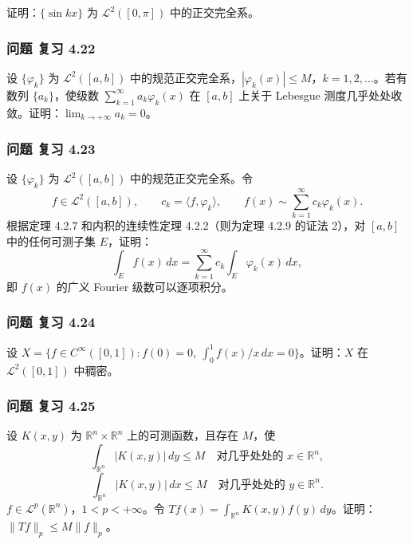 \documentclass[11pt,a4paper]{article}
\begin{document}
证明：\(\{\sin kx\}\) 为 \(\mathcal L^2([0,\pi])\) 中的正交完全系。

\subsubsection{问题 复习 4.22}\label{ch04-practice-ux95eeux9898-ux590dux4e60-4.22}

设 \(\{\varphi_k\}\) 为 \(\mathcal L^2([a,b])\)
中的规范正交完全系，\(|\varphi_k(x)|\le M\)，\(k=1,2,\ldots\)。若有数列
\(\{a_k\}\)，使级数 \(\sum_{k=1}^\infty a_k\varphi_k(x)\) 在 \([a,b]\)
上关于 Lebesgue 测度几乎处处收敛。证明：\(\lim_{k\to+\infty}a_k=0\)。

\subsubsection{问题 复习 4.23}\label{ch04-practice-ux95eeux9898-ux590dux4e60-4.23}

设 \(\{\varphi_k\}\) 为 \(\mathcal L^2([a,b])\) 中的规范正交完全系。令
\[
f\in\mathcal L^2([a,b]),\qquad c_k=\langle f,\varphi_k\rangle,\qquad
f(x)\sim\sum_{k=1}^\infty c_k\varphi_k(x).
\] 根据定理 4.2.7 和内积的连续性定理 4.2.2（则为定理 4.2.9 的证法
2），对 \([a,b]\) 中的任何可测子集 \(E\)，证明： \[
\int_Ef(x)\,dx=\sum_{k=1}^\infty c_k\int_E\varphi_k(x)\,dx,
\] 即 \(f(x)\) 的广义 Fourier 级数可以逐项积分。

\subsubsection{问题 复习 4.24}\label{ch04-practice-ux95eeux9898-ux590dux4e60-4.24}

设
\(X=\{f\in C^\infty([0,1]):f(0)=0,\ \int_0^1f(x)/x\,dx=0\}\)。证明：\(X\)
在 \(\mathcal L^2([0,1])\) 中稠密。

\subsubsection{问题 复习 4.25}\label{ch04-practice-ux95eeux9898-ux590dux4e60-4.25}

设 \(K(x,y)\) 为 \(\mathbb R^n\times\mathbb R^n\) 上的可测函数，且存在
\(M\)，使 \[
\int_{\mathbb R^n}|K(x,y)|\,dy\le M\quad\text{对几乎处处的 }x\in\mathbb R^n,
\] \[
\int_{\mathbb R^n}|K(x,y)|\,dx\le M\quad\text{对几乎处处的 }y\in\mathbb R^n.
\] \(f\in\mathcal L^p(\mathbb R^n)\)，\(1<p<+\infty\)。令
\(Tf(x)=\int_{\mathbb R^n}K(x,y)f(y)\,dy\)。证明：\(\|Tf\|_p\le M\|f\|_p\)。
\end{document}
